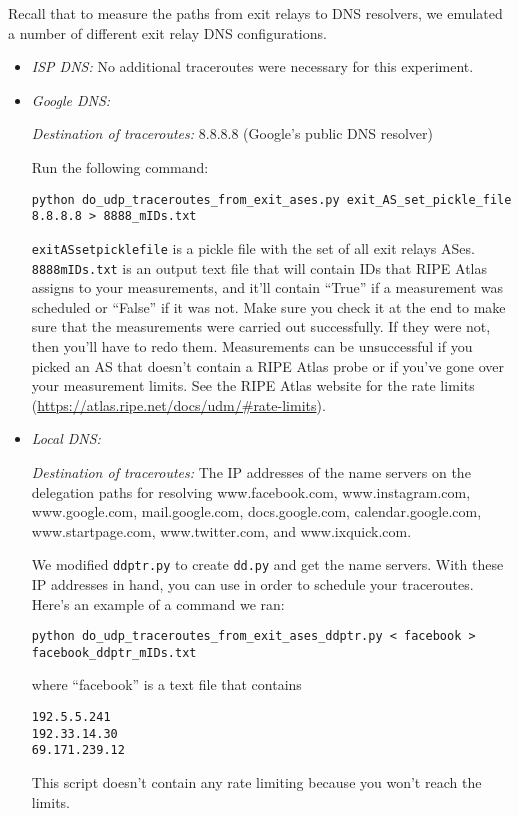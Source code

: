 \documentclass{article}
\begin{document}
Recall that to measure the paths from exit relays to DNS resolvers, we
emulated a number of different exit relay DNS configurations.
\begin{itemize}

\item \emph{ISP DNS:} No additional traceroutes were necessary for this experiment.

\item \emph{Google DNS:}

\emph{Destination of traceroutes:} 8.8.8.8 (Google's public DNS resolver)

Run the following command:
\begin{lstlisting}
python do_udp_traceroutes_from_exit_ases.py exit_AS_set_pickle_file 8.8.8.8 > 8888_mIDs.txt
\end{lstlisting}
{\tt exit\textunderscore AS\textunderscore set\textunderscore pickle\textunderscore file}
is a pickle file with the set of all exit relays ASes.
{\tt 8888\textunderscore mIDs.txt} is an output text file that will contain IDs that RIPE Atlas
assigns to your measurements, and it'll contain ``True'' if a measurement
was scheduled or ``False'' if it was not. Make sure you check it at the end
to make sure that the measurements were carried out successfully. If they were
not, then you'll have to redo them. Measurements can be unsuccessful if you picked
an AS that doesn't contain a RIPE Atlas probe or if you've gone over your
measurement limits. See the RIPE Atlas website for the rate limits
(\url{https://atlas.ripe.net/docs/udm/\#rate-limits}).

\item \emph{Local DNS:}

\emph{Destination of traceroutes:} The IP addresses of the name servers on the delegation
paths for resolving www.facebook.com, www.instagram.com, www.google.com,
mail.google.com, docs.google.com, calendar.google.com, www.startpage.com,
www.twitter.com, and www.ixquick.com.

We modified {\tt ddptr.py} to create {\tt dd.py} and get
the name servers. With these IP addresses in hand, you can use
 in order
to schedule your traceroutes. Here's an example of a command we ran:
\begin{lstlisting}
python do_udp_traceroutes_from_exit_ases_ddptr.py < facebook > facebook_ddptr_mIDs.txt
\end{lstlisting}
where ``facebook'' is a text file that contains
\begin{lstlisting}
192.5.5.241
192.33.14.30
69.171.239.12
\end{lstlisting}
This script doesn't contain any rate limiting because you won't reach the limits.


\end{itemize}
\end{document}
